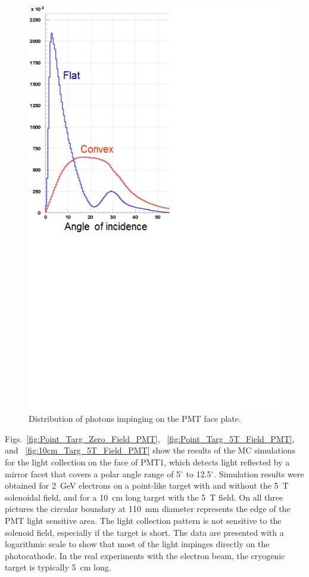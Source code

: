 \begin{figure}[!ht]
    \centering
    \includegraphics[width=1.0\linewidth,trim={0.0cm 9.1cm 6.3cm 0.1cm},clip]{images/Flat_Convex.jpg}
    \caption{Distribution of photons impinging on the PMT face plate.}
    \label{fig:Flat_Convex}
\end{figure}

Figs.~\ref{fig:Point_Targ_Zero_Field_PMT}, ~\ref{fig:Point_Targ_5T_Field_PMT}, and
~\ref{fig:10cm_Targ_5T_Field_PMT} show the results of the MC simulations for the light collection on the face
of PMT1, which detects light reflected by a mirror facet that covers a polar angle range of 5$^\circ$ to 12.5$^\circ$.
Simulation results were obtained for 2~GeV electrons on a point-like target with and without the 5~T solenoidal
field, and for a 10~cm long target with the 5~T field. On all three pictures the circular boundary at 110~mm diameter
represents the edge of the PMT light sensitive area. The light collection pattern is not sensitive to the solenoid field,
especially if the target is short. The data are presented with a logarithmic scale to show that most of the light
impinges directly on the photocathode. In the real experiments with the electron beam, the cryogenic target is
typically 5~cm long. 

